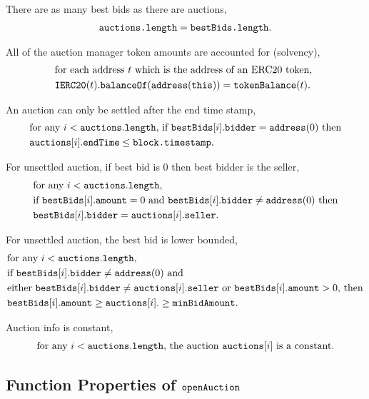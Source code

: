 \documentclass[a4paper,10pt]{article}
\begin{document}
There are as many best bids as there are auctions,
\begin{align*}
\texttt{auctions.length} = \texttt{bestBids.length}\text{.}
\end{align*}

All of the auction manager token amounts are accounted for (solvency),
\begin{align*}
&\text{for each address $t$ which is the address of an ERC20 token, } \\
&\texttt{IERC20}(t).\texttt{balanceOf}(\texttt{address}(\texttt{this})) = \texttt{tokenBalance}(t)\text{.}
\end{align*}

An auction can only be settled after the end time stamp,
\begin{align*}
&\text{for any $i < \texttt{auctions}.\texttt{length}$, if $\texttt{bestBids}[i].\texttt{bidder} = \texttt{address}(0)$ then} \\
&\texttt{auctions}[i].\texttt{endTime} \le \texttt{block.timestamp}\text{.}
\end{align*}

For unsettled auction, if best bid is 0 then best bidder is the seller,
\begin{align*}
&\text{for any $i < \texttt{auctions}.\texttt{length}$,} \\
&\text{if $\texttt{bestBids}[i].\texttt{amount} = 0$ and $\texttt{bestBids}[i].\texttt{bidder} \ne \texttt{address}(0)$ then} \\
&\texttt{bestBids}[i].\texttt{bidder} = \texttt{auctions}[i].\texttt{seller}.
\end{align*}

For unsettled auction, the best bid is lower bounded,
\begin{align*}
&\text{for any $i < \texttt{auctions}.\texttt{length}$,} \\
&\text{if $\texttt{bestBids}[i].\texttt{bidder} \ne \texttt{address}(0)$ and} \\
&\text{either $\texttt{bestBids}[i].\texttt{bidder} \ne \texttt{auctions}[i].\texttt{seller}$ or $\texttt{bestBids}[i].\texttt{amount} > 0$, then} \\
&\texttt{bestBids}[i].\texttt{amount} \ge \texttt{auctions}[i].\ge \texttt{minBidAmount}\text{.}
\end{align*}

Auction info is constant,
\begin{align*}
\text{for any $i < \texttt{auctions}.\texttt{length}$, the auction $\texttt{auctions}[i]$ is a constant.}
\end{align*}

\subsection*{Function Properties of $\texttt{openAuction}$}
\end{document}
